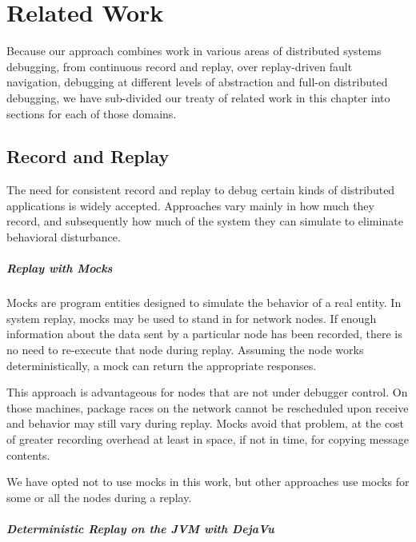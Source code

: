 \chapter{Related Work}
\label{cha:related-work}

Because our approach combines work in various areas of distributed
systems debugging, from continuous record and replay, over
replay-driven fault navigation, debugging at different levels of
abstraction and full-on distributed debugging, we have sub-divided our
treaty of related work in this chapter into sections for each of those
domains.

\section{Record and Replay}
\label{sec:record-replay}

The need for consistent record and replay to debug certain kinds of
distributed applications is widely accepted. Approaches vary mainly in
how much they record, and subsequently how much of the system they can
simulate to eliminate behavioral disturbance.

\paragraph{Replay with Mocks}
\label{sec:replay-with-mocks}

Mocks are program entities designed to simulate the behavior of a real
entity. In system replay, mocks may be used to stand in for network
nodes. If enough information about the data sent by a particular node
has been recorded, there is no need to re-execute that node during
replay. Assuming the node works deterministically, a mock can return
the appropriate responses.

This approach is advantageous for nodes that are not under debugger
control. On those machines, package races on the network cannot be
rescheduled upon receive and behavior may still vary during
replay. Mocks avoid that problem, at the cost of greater recording
overhead at least in space, if not in time, for copying message
contents.

We have opted not to use mocks in this work, but other approaches use
mocks for some or all the nodes during a replay.

\paragraph{Deterministic Replay on the JVM with DejaVu}
\label{sec:dejavu}

